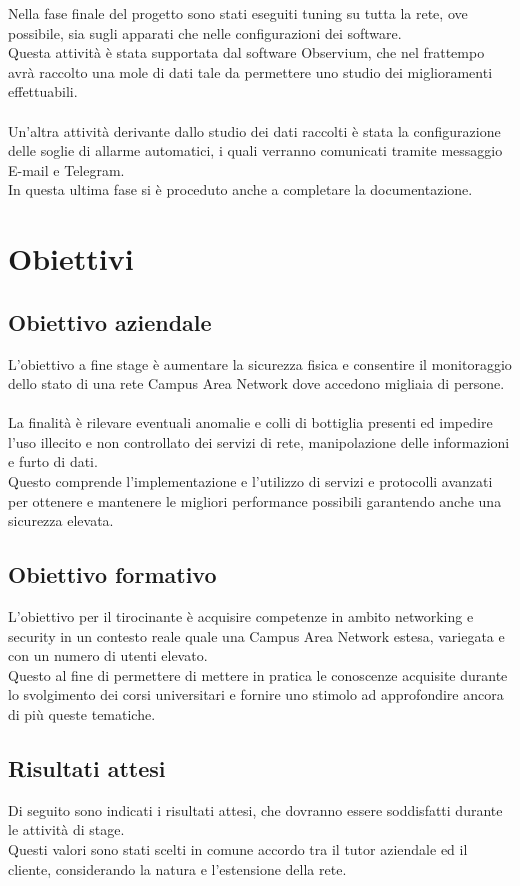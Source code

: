 \documentclass[Tesi.tex]{subfiles}
\begin{document}
Nella fase finale del progetto sono stati eseguiti tuning su tutta la rete, ove possibile, sia sugli apparati che nelle configurazioni dei software. \\
Questa attività è stata supportata dal software Observium, che nel frattempo avrà raccolto una mole di dati tale da permettere uno studio dei miglioramenti effettuabili.\\\\
Un'altra attività derivante dallo studio dei dati raccolti è stata la configurazione delle soglie di allarme automatici, i quali verranno comunicati tramite messaggio E-mail e Telegram. \\
In questa ultima fase si è proceduto anche a completare la documentazione. 

\newpage
\section{Obiettivi}
\subsection{Obiettivo aziendale}
L'obiettivo a fine stage è aumentare la sicurezza fisica e consentire il monitoraggio dello stato di una rete Campus Area Network dove accedono migliaia di persone. \\\\
La finalità è rilevare eventuali anomalie e colli di bottiglia presenti ed impedire l'uso illecito e non controllato dei servizi di rete, manipolazione delle informazioni e furto di dati. \\
Questo comprende l'implementazione e l'utilizzo di servizi e protocolli avanzati per ottenere e mantenere le migliori performance possibili garantendo anche una sicurezza elevata.

\subsection{Obiettivo formativo}
L'obiettivo per il tirocinante è acquisire competenze in ambito networking e security in un contesto reale quale una Campus Area Network estesa, variegata e con un numero di utenti elevato. \\
Questo al fine di permettere di mettere in pratica le conoscenze acquisite durante lo svolgimento dei corsi universitari e fornire uno stimolo ad approfondire ancora di più queste tematiche.

\newpage
\subsection{Risultati attesi}
Di seguito sono indicati i risultati attesi, che dovranno essere soddisfatti durante le attività di stage. \\
Questi valori sono stati scelti in comune accordo tra il tutor aziendale ed il cliente, considerando la natura e l'estensione della rete.
\end{document}
